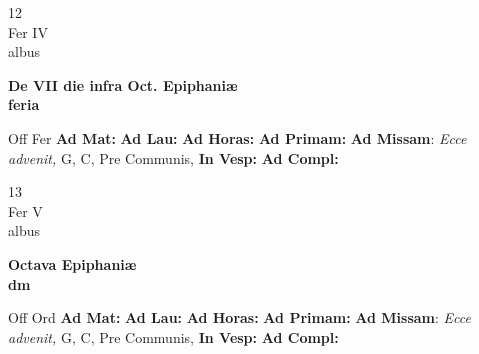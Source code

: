 \documentclass[10pt, openany]{book}
\begin{document}
        \begin{center}
            \begin{minipage}{3.5in}
                \vspace{2em}
                \begin{minipage}{0.5in}
                    {\Huge 12} \\
                    {\normalsize Fer IV} \\
                    {\normalsize albus}
                \end{minipage}
                \begin{minipage}{3.0in}
                    \textbf{ \large De VII die infra Oct. Epiphaniæ \\
                    \textnormal{\normalsize feria}} \\ 
                \end{minipage}
                \begin{justify}Off Fer
                    \textbf{Ad Mat: }
                    \textbf{Ad Lau: }
                    \textbf{Ad Horas: }
                    \textbf{Ad Primam: }\textbf{Ad Missam}: \textit{Ecce advenit,} G, C, Pre Communis,  
                    \textbf{In Vesp: }
                    \textbf{Ad Compl: }
                \end{justify}
            \end{minipage}
        \end{center}
    
        \begin{center}
            \begin{minipage}{3.5in}
                \vspace{2em}
                \begin{minipage}{0.5in}
                    {\Huge 13} \\
                    {\normalsize Fer V} \\
                    {\normalsize albus}
                \end{minipage}
                \begin{minipage}{3.0in}
                    \textbf{ \large Octava Epiphaniæ \\
                    \textnormal{\normalsize dm}} \\ 
                \end{minipage}
                \begin{justify}Off Ord
                    \textbf{Ad Mat: }
                    \textbf{Ad Lau: }
                    \textbf{Ad Horas: }
                    \textbf{Ad Primam: }\textbf{Ad Missam}: \textit{Ecce advenit,} G, C, Pre Communis,  
                    \textbf{In Vesp: }
                    \textbf{Ad Compl: }
                \end{justify}
            \end{minipage}
        \end{center}
    
\end{document}
